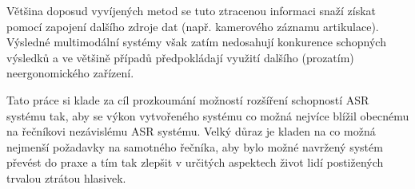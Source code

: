 Většina doposud vyvíjených metod se tuto ztracenou informaci snaží získat pomocí zapojení dalšího zdroje dat (např. kamerového záznamu artikulace). Výsledné multimodální systémy však zatím nedosahují konkurence schopných výsledků a ve většině případů předpokládají využití dalšího (prozatím) neergonomického zařízení.

Tato práce si klade za cíl prozkoumání možností rozšíření schopností ASR systému tak, aby se výkon vytvořeného systému co možná nejvíce blížil obecnému na řečníkovi nezávislému ASR systému. Velký důraz je kladen na co možná nejmenší požadavky na samotného řečníka, aby bylo možné navržený systém převést do praxe a tím tak zlepšit v určitých aspektech život lidí postižených trvalou ztrátou hlasivek.


